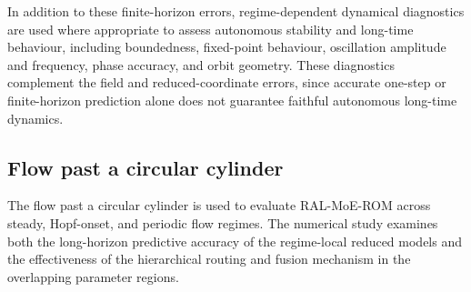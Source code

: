 In addition to these finite-horizon errors, regime-dependent dynamical
diagnostics are used where appropriate to assess autonomous stability and
long-time behaviour, including boundedness, fixed-point behaviour, oscillation
amplitude and frequency, phase accuracy, and orbit geometry. These diagnostics
complement the field and reduced-coordinate errors, since accurate one-step or
finite-horizon prediction alone does not guarantee faithful autonomous
long-time dynamics.




\subsection{Flow past a circular cylinder}
\label{subsec:flow_past_circular_cylinder}

The flow past a circular cylinder is used to evaluate RAL-MoE-ROM across
steady, Hopf-onset, and periodic flow regimes.  The numerical study examines
both the long-horizon predictive accuracy of the regime-local reduced models and the effectiveness of the hierarchical routing and fusion mechanism in the overlapping parameter regions.

